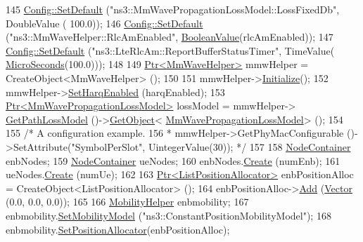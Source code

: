 \begin{DoxyCode}
145         \hyperlink{group__config_ga2e7882df849d8ba4aaad31c934c40c06}{Config::SetDefault} (\textcolor{stringliteral}{"ns3::MmWavePropagationLossModel::LossFixedDb"}, DoubleValue (
      100.0));
146         \hyperlink{group__config_ga2e7882df849d8ba4aaad31c934c40c06}{Config::SetDefault} (\textcolor{stringliteral}{"ns3::MmWaveHelper::RlcAmEnabled"}, 
      \hyperlink{classns3_1_1BooleanValue}{BooleanValue}(rlcAmEnabled));
147         \hyperlink{group__config_ga2e7882df849d8ba4aaad31c934c40c06}{Config::SetDefault} (\textcolor{stringliteral}{"ns3::LteRlcAm::ReportBufferStatusTimer"}, TimeValue(
      \hyperlink{group__timecivil_ga17465a639c8d1464e76538afdd78a9f0}{MicroSeconds}(100.0)));
148 
149   \hyperlink{classns3_1_1Ptr}{Ptr<MmWaveHelper>} mmwHelper = CreateObject<MmWaveHelper> ();
150 
151   mmwHelper->\hyperlink{classns3_1_1Object_af4411cb29971772fcd09203474a95078}{Initialize}();
152   mmwHelper->\hyperlink{classns3_1_1MmWaveHelper_af211a02952ab5f4eabe0219cf53e7e1c}{SetHarqEnabled} (harqEnabled);
153   \hyperlink{classns3_1_1Ptr}{Ptr<MmWavePropagationLossModel>} lossModel = mmwHelper->
      \hyperlink{classns3_1_1MmWaveHelper_a377d1c8c4c43a88801e905d88b8a5740}{GetPathLossModel} ()->\hyperlink{classns3_1_1Object_a13e18c00017096c8381eb651d5bd0783}{GetObject}<
      \hyperlink{classMmWavePropagationLossModel}{MmWavePropagationLossModel}> ();
154 
155   \textcolor{comment}{/* A configuration example.}
156 \textcolor{comment}{   * mmwHelper->GetPhyMacConfigurable ()->SetAttribute("SymbolPerSlot", UintegerValue(30)); */}
157 
158   \hyperlink{classns3_1_1NodeContainer}{NodeContainer} enbNodes;
159   \hyperlink{classns3_1_1NodeContainer}{NodeContainer} ueNodes;
160   enbNodes.\hyperlink{classns3_1_1NodeContainer_a787f059e2813e8b951cc6914d11dfe69}{Create} (numEnb);
161   ueNodes.\hyperlink{classns3_1_1NodeContainer_a787f059e2813e8b951cc6914d11dfe69}{Create} (numUe);
162 
163   \hyperlink{classns3_1_1Ptr}{Ptr<ListPositionAllocator>} enbPositionAlloc = 
      CreateObject<ListPositionAllocator> ();
164   enbPositionAlloc->\hyperlink{classns3_1_1ListPositionAllocator_a460e82f015ac012a73ba0ea0cccb3486}{Add} (\hyperlink{classns3_1_1Vector3D_a7e59b47bc94c9cb1dadff68c1d0112d8}{Vector} (0.0, 0.0, 0.0));
165 
166   \hyperlink{classns3_1_1MobilityHelper}{MobilityHelper} enbmobility;
167   enbmobility.\hyperlink{classns3_1_1MobilityHelper_a030275011b6f40682e70534d30280aba}{SetMobilityModel} (\textcolor{stringliteral}{"ns3::ConstantPositionMobilityModel"});
168   enbmobility.\hyperlink{classns3_1_1MobilityHelper_ac59d5295076be3cc11021566713a28c5}{SetPositionAllocator}(enbPositionAlloc);

\end{DoxyCode}

